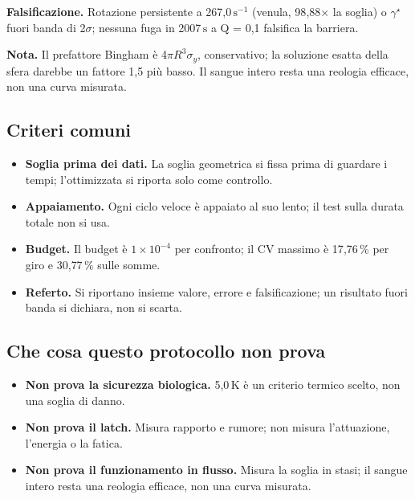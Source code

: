 \documentclass[9pt,a4paper]{article}
\begin{document}
\textbf{Falsificazione.} Rotazione persistente a 267{,}0\,$\mathrm{s}^{-1}$ (venula, 98{,}88$\times$ la soglia) o $\gamma^\star$ fuori banda di 2$\sigma$; nessuna fuga in 2007\,$\mathrm{s}$ a Q = 0{,}1 falsifica la barriera.

\textbf{Nota.} Il prefattore Bingham è 4$\pi R^3\sigma_y$, conservativo; la soluzione esatta della sfera darebbe un fattore 1{,}5 più basso. Il sangue intero resta una reologia efficace, non una curva misurata.

\subsection*{Criteri comuni}
\begin{itemize}
\item \textbf{Soglia prima dei dati.} La soglia geometrica si fissa prima di guardare i tempi; l'ottimizzata si riporta solo come controllo.
\item \textbf{Appaiamento.} Ogni ciclo veloce è appaiato al suo lento; il test sulla durata totale non si usa.
\item \textbf{Budget.} Il budget è $1\times 10^{-4}$ per confronto; il CV massimo è 17{,}76\,\% per giro e 30{,}77\,\% sulle somme.
\item \textbf{Referto.} Si riportano insieme valore, errore e falsificazione; un risultato fuori banda si dichiara, non si scarta.
\end{itemize}
\subsection*{Che cosa questo protocollo non prova}
\begin{itemize}
\item \textbf{Non prova la sicurezza biologica.} 5{,}0\,$\mathrm{K}$ è un criterio termico scelto, non una soglia di danno.
\item \textbf{Non prova il latch.} Misura rapporto e rumore; non misura l'attuazione, l'energia o la fatica.
\item \textbf{Non prova il funzionamento in flusso.} Misura la soglia in stasi; il sangue intero resta una reologia efficace, non una curva misurata.
\end{itemize}
\end{document}
